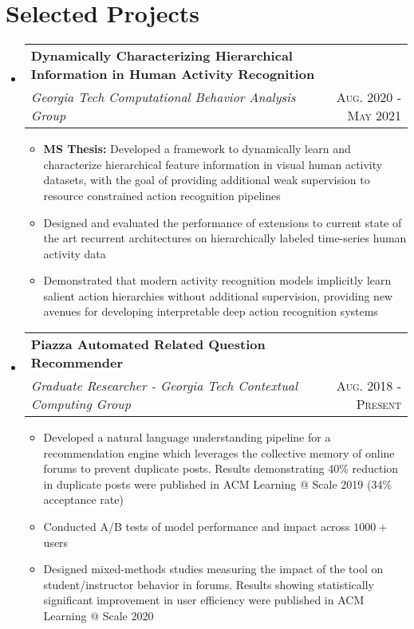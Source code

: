 \documentclass[letterpaper,11pt]{article}
\makeatletter
\newcommand{\resumePlainItem}[1]{
  \item\small{#1 \vspace{-1.0pt}}
}
\newcommand{\resumeSubheading}[4]{
  \vspace{-1pt}\item[]
    \begin{tabular*}{0.97\textwidth}{l@{\extracolsep{\fill}}r}
      \textbf{#1} & #2 \\
      \textit{\small#3} & \textsc{\small #4} \\ %
    \end{tabular*}\vspace{-5pt}
}
\newcommand{\resumeSubHeadingListStart}{\begin{itemize}[leftmargin=*]}
\newcommand{\resumeSubHeadingListEnd}{\end{itemize}}
\newcommand{\resumeItemListStart}{\begin{itemize}}
\newcommand{\resumeItemListEnd}{\end{itemize}\vspace{-5pt}}
\newenvironment{resumeItemList}{\resumeItemListStart}{\resumeItemListEnd}
\newenvironment{resumeSubheadingList}{\resumeSubHeadingListStart}{\resumeSubHeadingListEnd}
\makeatother
\begin{document}
\section{Selected Projects}
  \begin{resumeSubheadingList}
    \resumeSubheading{Dynamically Characterizing Hierarchical Information in Human Activity Recognition}{}
    {Georgia Tech Computational Behavior Analysis Group}{\hspace{-1.0in} Aug. 2020 - May 2021}
    \begin{resumeItemList}
      \resumePlainItem{\textbf{MS Thesis:} Developed a framework to dynamically learn and characterize
      hierarchical feature information in visual human activity datasets,
      with the goal of providing additional weak supervision to resource constrained
      action recognition pipelines}
      \resumePlainItem{Designed and evaluated the performance of extensions to current state of the art recurrent architectures
      on hierarchically labeled time-series human activity data}
      \resumePlainItem{Demonstrated that modern activity recognition models implicitly learn salient
      action hierarchies without additional supervision, providing new avenues for developing
      interpretable deep action recognition systems}
    \end{resumeItemList}
    \pagebreak
    \resumeSubheading
    {Piazza Automated Related Question Recommender}{} %
    {Graduate Researcher - Georgia Tech Contextual Computing Group}{Aug. 2018 - Present}
    \begin{resumeItemList}
      \resumePlainItem{Developed a natural language understanding pipeline
      for a recommendation engine which leverages the collective memory of
      online forums to prevent duplicate posts. Results demonstrating 40\% reduction in
      duplicate posts were published in ACM Learning @ Scale 2019 (34\% acceptance rate)}
      \resumePlainItem{Conducted A/B tests of model performance and impact across $1000+$ users}
      \resumePlainItem{Designed mixed-methods studies measuring the impact of
      the tool on student/instructor behavior in forums. Results showing statistically significant
      improvement in user efficiency were published in ACM Learning @ Scale 2020}

\end{resumeItemList}
\end{resumeSubheadingList}
\end{document}
